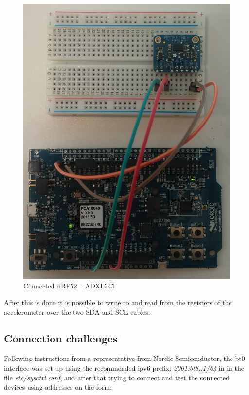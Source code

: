 \begin{figure}[ht]
    \centering
    \includegraphics[scale=0.35]{nrf-adxl.png}    \caption{Connected nRF52 -- ADXL345}
    \label{fig:nrf-adxl345}
\end{figure}

After this is done it is possible to write to and read from the registers of the accelerometer over the two SDA and SCL cables. 


\subsection{Connection challenges}

Following instructions from a representative from Nordic Semiconductor, the bt0 interface was set up using the recommended \gls{ipv6} prefix: \textit{2001:bt8::1/64} in in the file \textit{etc/sysctrl.conf}, and after that trying to connect and test the connected devices using addresses on the form: 


